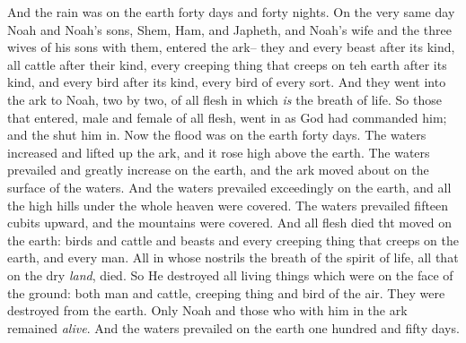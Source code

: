 \bverse And the rain was on the earth forty days and forty nights.
\bverse On the very same day Noah and Noah's sons, Shem, Ham, and Japheth, and Noah's wife and the three wives of his sons with them, entered the ark--
\bverse they and every beast after its kind, all cattle after their kind, every creeping thing that creeps on teh earth after its kind, and every bird after its kind, every bird of every sort.
\bverse And they went into the ark to Noah, two by two, of all flesh in which \textit{is} the breath of life.
\bverse So those that entered, male and female of all flesh, went in as God had commanded him; and the \lord shut him in.
\bverse Now the flood was on the earth forty days. The waters increased and lifted up the ark, and it rose high above the earth.
\bverse The waters prevailed and greatly increase on the earth, and the ark moved about on the surface of the waters.
\bverse And the waters prevailed exceedingly on the earth, and all the high hills under the whole heaven were covered.
\bverse The waters prevailed fifteen cubits upward, and the mountains were covered.
\bverse And all flesh died tht moved on the earth: birds and cattle and beasts and every creeping thing that creeps on the earth, and every man.
\bverse All in whose nostrils \was the breath of the spirit of life, all that \was on the dry \textit{land}, died.
\bverse So He destroyed all living things which were on the face of the ground: both man and cattle, creeping thing and bird of the air. They were destroyed from the earth. Only Noah and those who \were with him in the ark remained \textit{alive}.
\bverse And the waters prevailed on the earth one hundred and fifty days.
